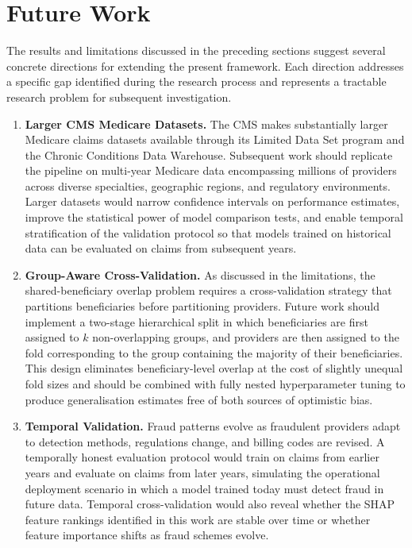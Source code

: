 \section{Future Work}

The results and limitations discussed in the preceding sections suggest several concrete directions for extending the present framework. Each direction addresses a specific gap identified during the research process and represents a tractable research problem for subsequent investigation.

\begin{enumerate}[leftmargin=*,label=\textbf{\arabic*.}]

\item \textbf{Larger CMS Medicare Datasets.}
The CMS makes substantially larger Medicare claims datasets available through its Limited Data Set program and the Chronic Conditions Data Warehouse. Subsequent work should replicate the pipeline on multi-year Medicare data encompassing millions of providers across diverse specialties, geographic regions, and regulatory environments. Larger datasets would narrow confidence intervals on performance estimates, improve the statistical power of model comparison tests, and enable temporal stratification of the validation protocol so that models trained on historical data can be evaluated on claims from subsequent years.

\item \textbf{Group-Aware Cross-Validation.}
As discussed in the limitations, the shared-beneficiary overlap problem requires a cross-validation strategy that partitions beneficiaries before partitioning providers. Future work should implement a two-stage hierarchical split in which beneficiaries are first assigned to $k$ non-overlapping groups, and providers are then assigned to the fold corresponding to the group containing the majority of their beneficiaries. This design eliminates beneficiary-level overlap at the cost of slightly unequal fold sizes and should be combined with fully nested hyperparameter tuning to produce generalisation estimates free of both sources of optimistic bias.

\item \textbf{Temporal Validation.}
Fraud patterns evolve as fraudulent providers adapt to detection methods, regulations change, and billing codes are revised. A temporally honest evaluation protocol would train on claims from earlier years and evaluate on claims from later years, simulating the operational deployment scenario in which a model trained today must detect fraud in future data. Temporal cross-validation would also reveal whether the SHAP feature rankings identified in this work are stable over time or whether feature importance shifts as fraud schemes evolve.


\end{enumerate}

